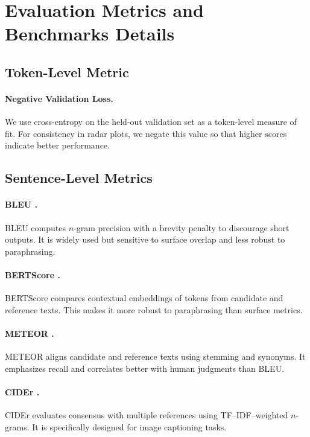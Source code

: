 \documentclass[11pt]{article}
\begin{document}
\section{Evaluation Metrics and Benchmarks Details}
\label{app:eval_metrics}

\subsection{Token-Level Metric}
\paragraph{Negative Validation Loss.}
We use cross-entropy on the held-out validation set as a token-level measure of fit. For consistency in radar plots, we negate this value so that higher scores indicate better performance.

\subsection{Sentence-Level Metrics}
\paragraph{BLEU \citep{papineni2002bleu}.}
BLEU computes $n$-gram precision with a brevity penalty to discourage short outputs. It is widely used but sensitive to surface overlap and less robust to paraphrasing.  

\paragraph{BERTScore \citep{zhang2019bertscore}.}
BERTScore compares contextual embeddings of tokens from candidate and reference texts. This makes it more robust to paraphrasing than surface metrics.  

\paragraph{METEOR \citep{banerjee2005meteor}.}
METEOR aligns candidate and reference texts using stemming and synonyms. It emphasizes recall and correlates better with human judgments than BLEU.  

\paragraph{CIDEr \citep{vedantam2015cider}.}
CIDEr evaluates consensus with multiple references using TF–IDF–weighted $n$-grams. It is specifically designed for image captioning tasks.  
\end{document}
